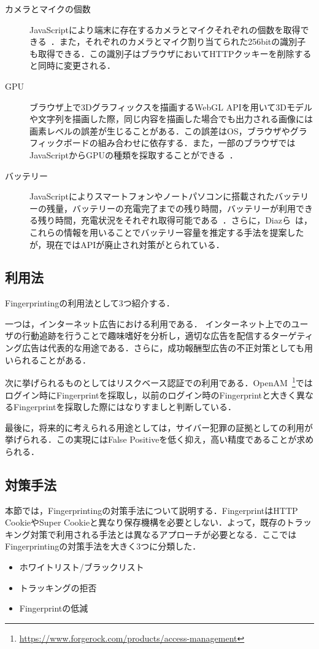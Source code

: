 \begin{description}
\item[カメラとマイクの個数]JavaScriptにより端末に存在するカメラとマイクそれぞれの個数を取得できる~\cite{takasu2015survey}．また，それぞれのカメラとマイク割り当てられた256bitの識別子も取得できる．この識別子はブラウザにおいてHTTPクッキーを削除すると同時に変更される．
\item[GPU]ブラウザ上で3Dグラフィックスを描画するWebGL APIを用いて3Dモデルや文字列を描画した際，同じ内容を描画した場合でも出力される画像には画素レベルの誤差が生じることがある．この誤差はOS，ブラウザやグラフィックボードの組み合わせに依存する．また，一部のブラウザではJavaScriptからGPUの種類を採取することができる~\cite{mowery2012pixel}．
\item[バッテリー]JavaScriptによりスマートフォンやノートパソコンに搭載されたバッテリーの残量，バッテリーの充電完了までの残り時間，バッテリーが利用できる残り時間，充電状況をそれぞれ取得可能である~\cite{takasu2015survey}．さらに，Diazら~\cite{diaz2015leaking}は，これらの情報を用いることでバッテリー容量を推定する手法を提案したが，現在ではAPIが廃止され対策がとられている． 

\end{description}
\subsection{利用法}
Fingerprintingの利用法として3つ紹介する．

一つは，インターネット広告における利用である．
インターネット上でのユーザの行動追跡を行うことで趣味嗜好を分析し，適切な広告を配信するターゲティング広告は代表的な用途である．さらに，成功報酬型広告の不正対策としても用いられることがある．

次に挙げられるものとしてはリスクベース認証での利用である．OpenAM~\footnote{\url{https://www.forgerock.com/products/access-management}}ではログイン時にFingerprintを採取し，以前のログイン時のFingerprintと大きく異なるFingerprintを採取した際にはなりすましと判断している．

最後に，将来的に考えられる用途としては，サイバー犯罪の証拠としての利用が挙げられる．この実現にはFalse Positiveを低く抑え，高い精度であることが求められる．
\subsection{対策手法}
本節では，Fingerprintingの対策手法について説明する．FingerprintはHTTP CookieやSuper Cookieと異なり保存機構を必要としない．よって，既存のトラッキング対策で利用される手法とは異なるアプローチが必要となる．ここではFingerprintingの対策手法を大きく3つに分類した．
\begin{itemize}
\item ホワイトリスト/ブラックリスト
\item トラッキングの拒否
\item Fingerprintの低減
\end{itemize}
